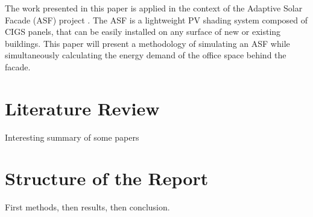 The work presented in this paper is applied in the context of the Adaptive Solar Facade (ASF) project \cite{nagy2015frontiers}. The ASF is a lightweight PV shading system composed of CIGS panels, that can be easily installed on any surface of new or existing buildings. This paper will present a methodology of simulating an ASF while simultaneously calculating the energy demand of the office space behind the facade.


\section{Literature Review}

Interesting summary of some papers
\section{Structure of the Report}

First methods, then results, then conclusion.












